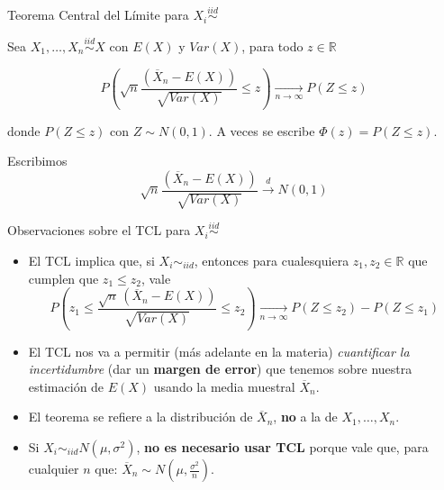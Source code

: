 \documentclass{beamer}
\theoremstyle{definition}
\begin{document}
\begin{frame}{\color{rosee}Teorema Central del L\'imite para $X_i\stackrel{iid}{\sim}$} \small
  

  
  \begin{theorem}
    Sea $X_{1},\dots,X_{n}\stackrel{iid}{\sim} X$ con $E(X)$ y
    $Var(X)$, para todo $z\in\mathbb{R}$
    
    \begin{equation*}
     P\left(\sqrt{n}\frac{ (\overline{X}_{n}-E(X))}{\sqrt{Var(X)}} 
        \leq z \right) \underset{n\to\infty}{\longrightarrow} P(Z \leq z)
    \end{equation*}

  \end{theorem}
  
    \vspace{12pt}
    
    donde $P(Z\leq z)$ con $Z \sim N(0,1)$. A veces se escribe $\Phi(z) = P(Z\leq z)$.
  
  \medskip  
   Escribimos \[\sqrt{n}\frac{ (\overline{X}_{n}-E(X))}{\sqrt{Var(X)}}\overset{d}{\to} N(0,1)\]
\end{frame}

 \begin{frame}{\color{rosee}Observaciones sobre el TCL para $X_i\stackrel{iid}{\sim}$}
\small
  
  \begin{itemize}
  \item   
    El  TCL implica que, si $X_i\sim_{iid}$, entonces para cualesquiera $z_1, z_2 \in \mathbb{R}$ que cumplen que $z_{1} \leq z_{2}$, vale 
    $$
    P\left(z_{1}\leq \frac{ \sqrt{n}\, (\overline{X}_{n}-E(X))}{\sqrt{Var(X)}} 
        \leq z_{2} \right) \underset{n\to\infty}{\longrightarrow} P(Z \leq z_{2}) - P(Z \leq z_{1})
    $$
  \item  El TCL nos va a permitir (m\'as adelante en la materia)   \textit{cuantificar la incertidumbre} (dar un \textbf{margen de error}) que tenemos sobre nuestra estimaci\'on de $E(X)$ usando la media muestral $\overline{X}_n$.
      \item  El teorema se refiere a la distribuci\'on de $\overline{X}_{n}$,
    \textbf{no} a la de $X_{1}, \dots, X_{n}$.
    \item Si $X_i\sim_{iid} N(\mu,\sigma^2)$, \textbf{no es necesario usar TCL} porque vale que, para cualquier $n$ que: $\overline{X}_n\sim N\left(\mu ,\frac{\sigma^2}{n}\right)$.
    \end{itemize}
  
\end{frame}
\end{document}
